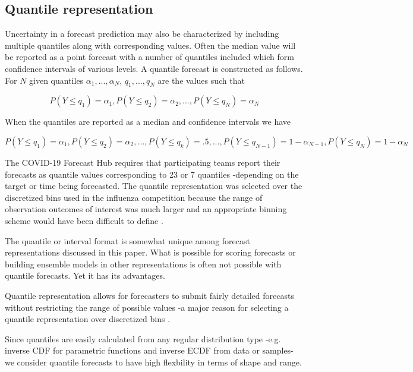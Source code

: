 \documentclass{article}\usepackage[]{graphicx}\usepackage[]{color}
\begin{document}
\subsection{Quantile representation}
Uncertainty in a forecast prediction may also be characterized by  including
multiple quantiles along with corresponding values. Often the median value will
be reported as a point forecast with a number of quantiles included which form 
confidence intervals of various levels.
A quantile forecast is constructed as follows.
For $N$ given quantiles $\alpha_1,..., \alpha_N$, $q_1,..., q_N$ are the values
such that 

\begin{equation}
  P(Y \leq q_1) = \alpha_1, P(Y \leq q_2) = \alpha_2, ..., 
  P(Y \leq q_N) = \alpha_N
\end{equation}

When the quantiles are reported as a median and confidence intervals we have

\begin{equation}
  P(Y \leq q_1) = \alpha_1, P(Y \leq q_2) = \alpha_2, ..., P(Y \leq q_k) = .5, 
  ..., 
  P(Y \leq q_{N-1}) = 1 - \alpha_{N-1}, P(Y \leq q_N) = 1 - \alpha_N
\end{equation}

The COVID-19 Forecast Hub requires that participating teams report their
forecasts as quantile values corresponding to 23 or 7 quantiles -depending on 
the target or time being forecasted. The quantile representation was selected
over the discretized bins used in the influenza competition because the range 
of observation outcomes of interest was much larger and an appropriate binning
scheme would have been difficult to define \cite{bracher2021evaluating}.

The quantile or interval format is somewhat unique among forecast 
representations discussed in this paper. What is possible for scoring forecasts
or building ensemble models in other representations is often not possible with
quantile forecasts. Yet it has its advantages. 

Quantile representation allows for forecasters to submit fairly detailed
forecasts without restricting the range of possible values -a major reason for 
selecting a quantile representation over discretized bins 
\cite{bracher2021evaluating}. 

Since quantiles are easily calculated from any regular distribution type
-e.g. inverse CDF for parametric functions and inverse ECDF from data or 
samples- we consider quantile forecasts to have high flexbility in terms of 
shape and range. 
\end{document}

